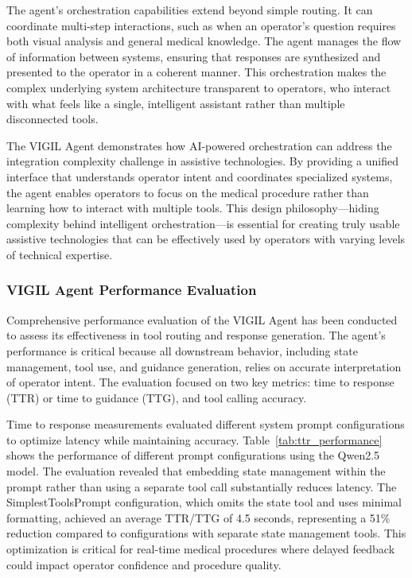 \documentclass[12pt,a4paper]{article}
\begin{document}
The agent's orchestration capabilities extend beyond simple routing. It can coordinate multi-step interactions, such as when an operator's question requires both visual analysis and general medical knowledge. The agent manages the flow of information between systems, ensuring that responses are synthesized and presented to the operator in a coherent manner. This orchestration makes the complex underlying system architecture transparent to operators, who interact with what feels like a single, intelligent assistant rather than multiple disconnected tools.

The VIGIL Agent demonstrates how AI-powered orchestration can address the integration complexity challenge in assistive technologies. By providing a unified interface that understands operator intent and coordinates specialized systems, the agent enables operators to focus on the medical procedure rather than learning how to interact with multiple tools. This design philosophy—hiding complexity behind intelligent orchestration—is essential for creating truly usable assistive technologies that can be effectively used by operators with varying levels of technical expertise.

\subsubsection{VIGIL Agent Performance Evaluation}

Comprehensive performance evaluation of the VIGIL Agent has been conducted to assess its effectiveness in tool routing and response generation. The agent's performance is critical because all downstream behavior, including state management, tool use, and guidance generation, relies on accurate interpretation of operator intent. The evaluation focused on two key metrics: time to response (TTR) or time to guidance (TTG), and tool calling accuracy.

Time to response measurements evaluated different system prompt configurations to optimize latency while maintaining accuracy. Table~\ref{tab:ttr_performance} shows the performance of different prompt configurations using the Qwen2.5 model. The evaluation revealed that embedding state management within the prompt rather than using a separate tool call substantially reduces latency. The SimplestToolsPrompt configuration, which omits the state tool and uses minimal formatting, achieved an average TTR/TTG of 4.5 seconds, representing a 51\% reduction compared to configurations with separate state management tools. This optimization is critical for real-time medical procedures where delayed feedback could impact operator confidence and procedure quality.
\end{document}
